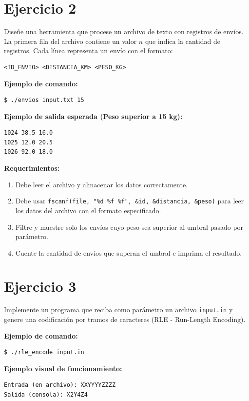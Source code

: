 \documentclass[12pt,a4paper]{article}
\begin{document}
\newpage

\section*{Ejercicio 2}
Diseñe una herramienta que procese un archivo de texto con registros de envíos. La primera fila del archivo contiene un valor $n$ que indica la cantidad de registros. Cada línea representa un envío con el formato:

\begin{lstlisting}[numbers=none]
<ID_ENVIO> <DISTANCIA_KM> <PESO_KG>
\end{lstlisting}

\textbf{Ejemplo de comando:} 
\begin{lstlisting}[numbers=none]
$ ./envios input.txt 15
\end{lstlisting}

\textbf{Ejemplo de salida esperada (Peso superior a 15 kg):}
\begin{lstlisting}[numbers=none]
1024 38.5 16.0
1025 12.0 20.5
1026 92.0 18.0
\end{lstlisting}

\textbf{Requerimientos:}
\begin{enumerate}
    \item Debe leer el archivo y almacenar los datos correctamente.
    \item Debe usar \texttt{fscanf(file, "\%d \%f \%f", \&id, \&distancia, \&peso)} para leer los datos del archivo con el formato especificado.
    \item Filtre y muestre solo los envíos cuyo peso sea superior al umbral pasado por parámetro.
    \item Cuente la cantidad de envíos que superan el umbral e imprima el resultado.
\end{enumerate}

\newpage

\section*{Ejercicio 3}
Implemente un programa que reciba como parámetro un archivo \texttt{input.in} y genere una codificación por tramos de caracteres (RLE - Run-Length Encoding).

\textbf{Ejemplo de comando:}
\begin{lstlisting}[numbers=none]
$ ./rle_encode input.in
\end{lstlisting}

\textbf{Ejemplo visual de funcionamiento:}
\begin{lstlisting}[numbers=none]
Entrada (en archivo): XXYYYYZZZZ
Salida (consola): X2Y4Z4
\end{lstlisting}
\end{document}
